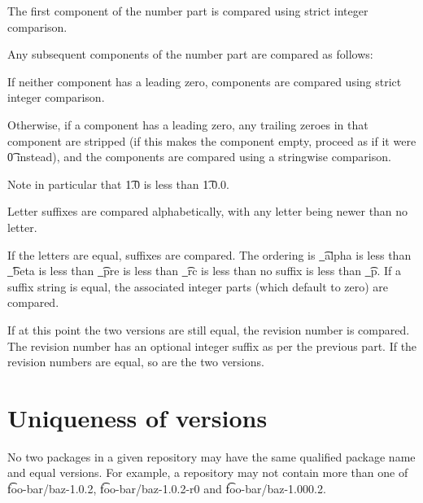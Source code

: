 The first component of the number part is compared using strict integer comparison.

Any subsequent components of the number part are compared as follows:

\begin{bulletlist}
\item If neither component has a leading zero, components are compared using strict integer
  comparison.
\item Otherwise, if a component has a leading zero, any trailing zeroes in that component
  are stripped (if this makes the component empty, proceed as if it were \t{0} instead),
  and the components are compared using a stringwise comparison.
\end{bulletlist}

Note in particular that \t{1.0} is less than \t{1.0.0}.

Letter suffixes are compared alphabetically, with any letter being newer than no letter.

If the letters are equal, suffixes are compared. The ordering is \t{\_alpha} is less than
\t{\_beta} is less than \t{\_pre} is less than \t{\_rc} is less than no suffix is less than
\t{\_p}. If a suffix string is equal, the associated integer parts (which default to zero)
are compared.

If at this point the two versions are still equal, the revision number is compared. The revision
number has an optional integer suffix as per the previous part. If the revision numbers are equal,
so are the two versions.

\section{Uniqueness of versions}

No two packages in a given repository may have the same qualified package name and equal versions.
For example, a repository may not contain more than one of \t{foo-bar/baz-1.0.2},
\t{foo-bar/baz-1.0.2-r0} and \t{foo-bar/baz-1.000.2}.

